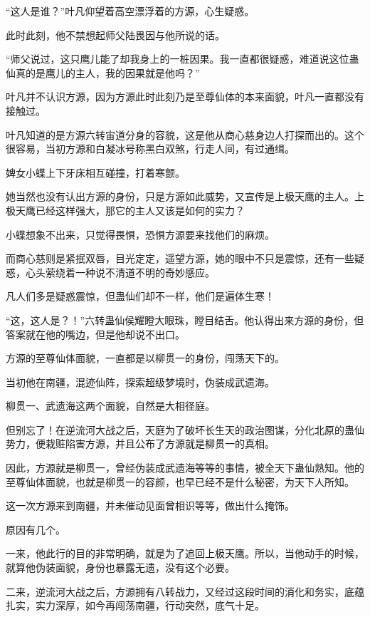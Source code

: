 
\begin{this_body}

“这人是谁？”叶凡仰望着高空漂浮着的方源，心生疑惑。

此时此刻，他不禁想起师父陆畏因与他所说的话。

“师父说过，这只鹰儿能了却我身上的一桩因果。我一直都很疑惑，难道说这位蛊仙真的是鹰儿的主人，我的因果就是他吗？”

叶凡并不认识方源，因为方源此时此刻乃是至尊仙体的本来面貌，叶凡一直都没有接触过。

叶凡知道的是方源六转宙道分身的容貌，这是他从商心慈身边人打探而出的。这个很容易，当初方源和白凝冰号称黑白双煞，行走人间，有过通缉。

婢女小蝶上下牙床相互碰撞，打着寒颤。

她当然也没有认出方源的身份，只是方源如此威势，又宣传是上极天鹰的主人。上极天鹰已经这样强大，那它的主人又该是如何的实力？

小蝶想象不出来，只觉得畏惧，恐惧方源要来找他们的麻烦。

而商心慈则是紧抿双唇，目光定定，遥望方源，她的眼中不只是震惊，还有一些疑惑，心头萦绕着一种说不清道不明的奇妙感应。

凡人们多是疑惑震惊，但蛊仙们却不一样，他们是遍体生寒！

“这，这人是？！”六转蛊仙侯耀瞪大眼珠，瞠目结舌。他认得出来方源的身份，但答案就在他的嘴边，但是他却说不出口。

方源的至尊仙体面貌，一直都是以柳贯一的身份，闯荡天下的。

当初他在南疆，混迹仙阵，探索超级梦境时，伪装成武遗海。

柳贯一、武遗海这两个面貌，自然是大相径庭。

但别忘了！在逆流河大战之后，天庭为了破坏长生天的政治图谋，分化北原的蛊仙势力，便栽赃陷害方源，并且公布了方源就是柳贯一的真相。

因此，方源就是柳贯一，曾经伪装成武遗海等等的事情，被全天下蛊仙熟知。他的至尊仙体面貌，也就是柳贯一的容颜，也早已经不是什么秘密，为天下人所知。

这一次方源来到南疆，并未催动见面曾相识等等，做出什么掩饰。

原因有几个。

一来，他此行的目的非常明确，就是为了追回上极天鹰。所以，当他动手的时候，就算他伪装面貌，身份也暴露无遗，没有这个必要。

二来，逆流河大战之后，方源拥有八转战力，又经过这段时间的消化和务实，底蕴扎实，实力深厚，如今再闯荡南疆，行动突然，底气十足。


\end{this_body}
